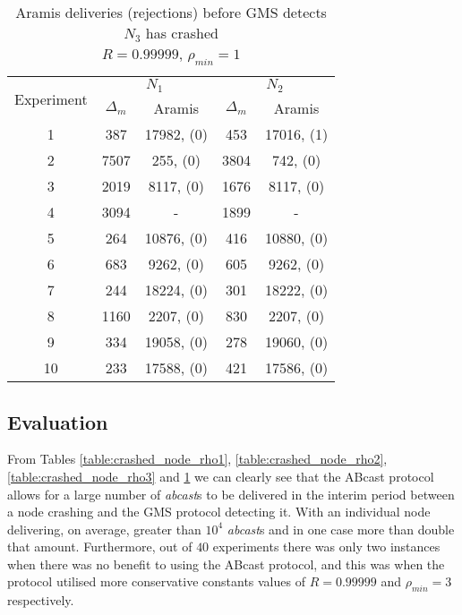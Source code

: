 \begin{table}[p]
    \begin{center}
        \renewcommand{\arraystretch}{1.25}
        \begin{tabular}{|c|c|c|c|c|}
            \hline
            \multirow{2}{*}{Experiment} & \multicolumn{2}{|c|}{$N_1$} & \multicolumn{2}{|c|}{$N_2$} \\ \cline{2-5}
                                                       & $\Delta_m$&\textsf{Aramis} & $\Delta_m$&\textsf{Aramis} \\ \hline \hline
            1 & 387 & 17982, (0) & 453 & 17016, (1)  \\ \hline
            2 & 7507 & 255, (0) & 3804 & 742, (0)  \\ \hline
            3 & 2019 & 8117, (0) & 1676 & 8117, (0)  \\ \hline
            4 & 3094 & - & 1899 & -  \\ \hline
            5 & 264 & 10876, (0) & 416 & 10880, (0)  \\ \hline
            6 & 683 & 9262, (0) & 605 & 9262, (0)  \\ \hline
            7 & 244 & 18224, (0) & 301 & 18222, (0)  \\ \hline
            8 & 1160 & 2207, (0) & 830 & 2207, (0)  \\ \hline
            9 & 334 & 19058, (0) & 278 & 19060, (0)  \\ \hline
            10 & 233 & 17588, (0) & 421 & 17586, (0)  \\ \hline
        \end{tabular}
        \caption{\textsf{Aramis} deliveries (rejections) before GMS detects $N_3$ has crashed \\ $R=0.99999$, $\rho_{min}=1$}
        \label{table:crashed_node_R.99999}
    \end{center}
\end{table}

    \subsection{Evaluation}
    From Tables \ref{table:crashed_node_rho1}, \ref{table:crashed_node_rho2},  \ref{table:crashed_node_rho3} and \ref{table:crashed_node_R.99999} we can clearly see that the \textsf{ABcast} protocol allows for a large number of \emph{abcast}s to be delivered in the interim period between a node crashing and the GMS protocol detecting it.  With an individual node delivering, on average, greater than $10^4$ \emph{abcast}s and in one case more than double that amount.  Furthermore, out of $40$ experiments there was only two instances when there was no benefit to using the \textsf{ABcast} protocol, and this was when the protocol utilised more conservative constants values of $R=0.99999$ and $\rho_{min}=3$ respectively.  
    

